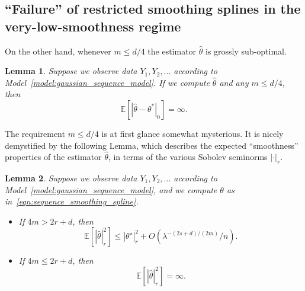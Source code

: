 \documentclass{article}
\newcommand{\1}{\mathbf{1}}
\newcommand{\Ebb}{\mathbb{E}}
\newcommand{\wh}[1]{\widehat{#1}}
\theoremstyle{alden}
\theoremstyle{aldenthm}
\newtheorem{lemma}{Lemma}
\theoremstyle{definition}
\theoremstyle{remark}
\begin{document}
\subsection{``Failure'' of restricted smoothing splines in the very-low-smoothness regime}
On the other hand, whenever $m \leq d/4$ the estimator $\wh{\theta}$ is grossly sub-optimal. 
\begin{lemma}
	\label{lem:failure_very_low_smoothness}
	Suppose we observe data $Y_1,Y_2,\ldots$ according to Model~\eqref{model:gaussian_sequence_model}. If we compute $\wh{\theta}$ and any $m \leq d/4$, then
	\begin{equation}
	\label{eqn:failure_very_low_smoothness}
	\Ebb[|\wh{\theta} - \theta^{\ast}|_{0}] = \infty.
	\end{equation}
\end{lemma}
The requirement $m \leq d/4$ is at first glance somewhat mysterious. It is nicely demystified by the following Lemma, which describes the expected ``smoothness'' properties of the estimator $\wh{\theta}$, in terms of the various Sobolev seminorms $|\cdot|_r$.
\begin{lemma}
	\label{lem:smoothness_of_sequence_smoothing_splines}
	Suppose we observe data $Y_1,Y_2,\ldots$ according to Model~\eqref{model:gaussian_sequence_model}, and we compute $\theta$ as in~\eqref{eqn:sequence_smoothing_spline}.
	\begin{itemize}
		\item If $4m > 2r + d$, then
		\begin{equation}
		\label{eqn:smoothness_of_sequence_smoothing_splines_1}
		\Ebb[|\wh{\theta}|_{r}^2] \leq |\theta^{\star}|_r^2 + O(\lambda^{-(2s + d)/(2m)}/n).
		\end{equation}
		\item If $4m \leq 2r + d$, then 
		\begin{equation}
		\label{eqn:smoothness_of_sequence_smoothing_splines_2}
		\Ebb[|\wh{\theta}|_{r}^2] = \infty.
		\end{equation}
	\end{itemize}
\end{lemma}
\end{document}
